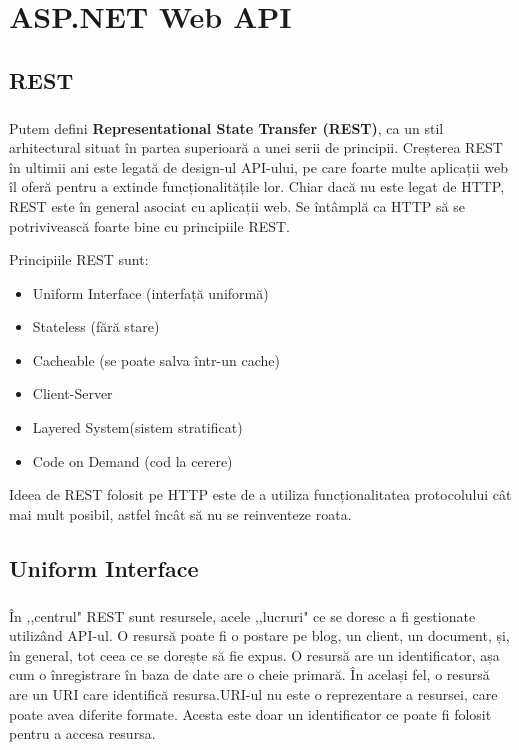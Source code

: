 \chapter{ASP.NET Web API}

\section{REST}

\paragraph{} Putem defini \textbf{Representational State Transfer (REST)}, ca un stil arhitectural situat în partea superioară a unei serii de principii. Creșterea REST în ultimii ani este legată de design-ul API-ului, pe care foarte multe aplicații web îl oferă pentru a extinde funcționalitățile lor. Chiar dacă nu este legat de HTTP, REST este în general asociat cu aplicații web. Se întâmplă ca HTTP să se potrivivească foarte bine cu principiile REST.\cite{19}

Principiile REST sunt:

\begin{itemize}
\item Uniform Interface (interfață uniformă) 
\item Stateless (fără stare)
\item Cacheable (se poate salva într-un cache)
\item Client-Server
\item Layered System(sistem stratificat)
\item Code on Demand (cod la cerere)
\end{itemize}

Ideea de REST folosit pe HTTP este de a utiliza funcționalitatea protocolului cât mai mult posibil, astfel încât să nu se reinventeze roata.

\section{Uniform Interface}

\paragraph{} În ,,centrul" REST sunt resursele, acele ,,lucruri" ce se doresc a fi gestionate utilizând API-ul. O resursă poate fi o postare pe blog, un client, un document, și, în general, tot ceea ce se dorește să fie expus. O resursă are un identificator, așa cum o înregistrare în baza de date are o cheie primară. În același fel, o resursă are un URI care identifică resursa.URI-ul nu este o reprezentare a resursei, care poate avea diferite formate. Acesta este doar un identificator ce poate fi folosit pentru a accesa resursa.

